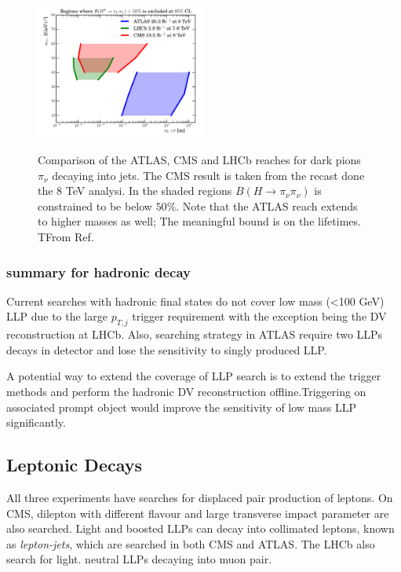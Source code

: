 \begin{figure}
    \centering
    \caption{Comparison of the ATLAS, CMS and LHCb reaches for dark pions $\pi_{\nu}$ decaying into jets. The CMS result is taken from the recast done the 8 TeV analysi. In the shaded regions $B(H\rightarrow\pi_{\nu}\pi_{\nu})$ is constrained to be below $50\%$. Note that the ATLAS reach extends to higher masses as well; The meaningful bound is on the lifetimes. TFrom Ref.\cite{alimena2019searching}}
    \includegraphics[width=0.5\textwidth]{fig/LHCbhadronicCompare.png}
    \label{fig:LHCbHadronicCompare}
\end{figure}


\subsubsection{summary for hadronic decay}
Current searches with hadronic final states do not cover low mass (<100 GeV) LLP due to the large $p_{T,j}$ trigger requirement with the exception being the DV reconstruction at LHCb. Also, searching strategy in ATLAS require two LLPs decays in detector and lose the sensitivity to singly produced LLP. 

A potential way to extend the coverage of LLP search is to extend the trigger methods and perform the hadronic DV reconstruction offline.Triggering on associated prompt object would improve the sensitivity of low mass LLP significantly.


\subsection{Leptonic Decays}
All three experiments have searches for displaced pair production of leptons. On CMS, dilepton with different flavour and large transverse impact parameter are also searched. Light and boosted LLPs can decay into collimated leptons, known as \textit{lepton-jets}, which are searched in both CMS and ATLAS. The LHCb also search for light. neutral LLPs decaying into muon pair.


